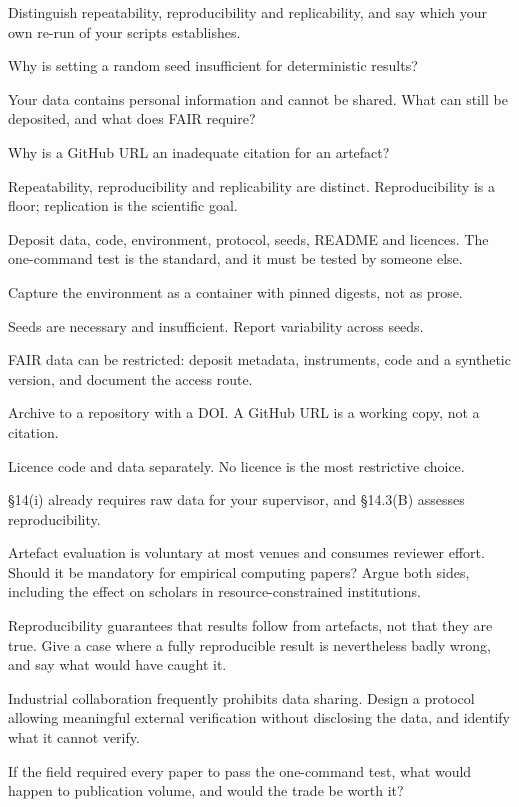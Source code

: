 \begin{checkpoint}
\begin{tightnum}
  \item Distinguish repeatability, reproducibility and replicability, and say
    which your own re-run of your scripts establishes.
  \item Why is setting a random seed insufficient for deterministic results?
  \item Your data contains personal information and cannot be shared. What can
    still be deposited, and what does FAIR require?
  \item Why is a GitHub URL an inadequate citation for an artefact?
\end{tightnum}
\end{checkpoint}

\begin{chaptersummary}
\begin{tight}
  \item Repeatability, reproducibility and replicability are distinct.
    Reproducibility is a floor; replication is the scientific goal.
  \item Deposit data, code, environment, protocol, seeds, README and licences.
    The one-command test is the standard, and it must be tested by someone else.
  \item Capture the environment as a container with pinned digests, not as
    prose.
  \item Seeds are necessary and insufficient. Report variability across seeds.
  \item FAIR data can be restricted: deposit metadata, instruments, code and a
    synthetic version, and document the access route.
  \item Archive to a repository with a DOI. A GitHub URL is a working copy, not
    a citation.
  \item Licence code and data separately. No licence is the most restrictive
    choice.
  \item \S14(i) already requires raw data for your supervisor, and \S14.3(B)
    assesses reproducibility.
\end{tight}
\end{chaptersummary}

\begin{reviewq}
  \item Artefact evaluation is voluntary at most venues and consumes reviewer
    effort. Should it be mandatory for empirical computing papers? Argue both
    sides, including the effect on scholars in resource-constrained
    institutions.
  \item Reproducibility guarantees that results follow from artefacts, not that
    they are true. Give a case where a fully reproducible result is
    nevertheless badly wrong, and say what would have caught it.
  \item Industrial collaboration frequently prohibits data sharing. Design a
    protocol allowing meaningful external verification without disclosing the
    data, and identify what it cannot verify.
  \item If the field required every paper to pass the one-command test, what
    would happen to publication volume, and would the trade be worth it?
\end{reviewq}
